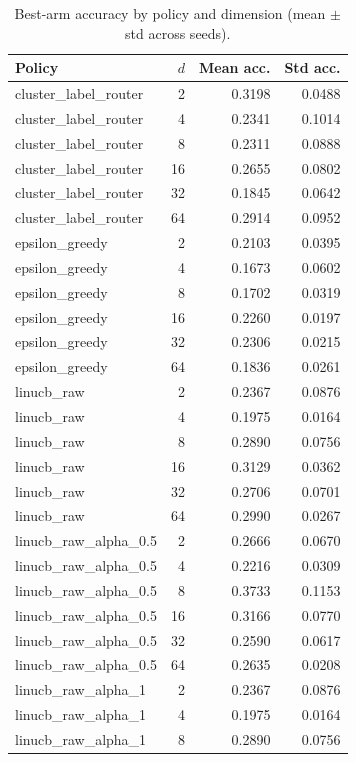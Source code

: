 \begin{table}[t]
\centering
\caption{Best-arm accuracy by policy and dimension (mean $\pm$ std across seeds).}
\label{tab:best-arm-acc-summary}
\begin{tabular}{lrrr}
\toprule
Policy & $d$ & Mean acc. & Std acc. \\
\midrule
cluster\_label\_router & 2 & 0.3198 & 0.0488 \\
cluster\_label\_router & 4 & 0.2341 & 0.1014 \\
cluster\_label\_router & 8 & 0.2311 & 0.0888 \\
cluster\_label\_router & 16 & 0.2655 & 0.0802 \\
cluster\_label\_router & 32 & 0.1845 & 0.0642 \\
cluster\_label\_router & 64 & 0.2914 & 0.0952 \\
epsilon\_greedy & 2 & 0.2103 & 0.0395 \\
epsilon\_greedy & 4 & 0.1673 & 0.0602 \\
epsilon\_greedy & 8 & 0.1702 & 0.0319 \\
epsilon\_greedy & 16 & 0.2260 & 0.0197 \\
epsilon\_greedy & 32 & 0.2306 & 0.0215 \\
epsilon\_greedy & 64 & 0.1836 & 0.0261 \\
linucb\_raw & 2 & 0.2367 & 0.0876 \\
linucb\_raw & 4 & 0.1975 & 0.0164 \\
linucb\_raw & 8 & 0.2890 & 0.0756 \\
linucb\_raw & 16 & 0.3129 & 0.0362 \\
linucb\_raw & 32 & 0.2706 & 0.0701 \\
linucb\_raw & 64 & 0.2990 & 0.0267 \\
linucb\_raw\_alpha\_0.5 & 2 & 0.2666 & 0.0670 \\
linucb\_raw\_alpha\_0.5 & 4 & 0.2216 & 0.0309 \\
linucb\_raw\_alpha\_0.5 & 8 & 0.3733 & 0.1153 \\
linucb\_raw\_alpha\_0.5 & 16 & 0.3166 & 0.0770 \\
linucb\_raw\_alpha\_0.5 & 32 & 0.2590 & 0.0617 \\
linucb\_raw\_alpha\_0.5 & 64 & 0.2635 & 0.0208 \\
linucb\_raw\_alpha\_1 & 2 & 0.2367 & 0.0876 \\
linucb\_raw\_alpha\_1 & 4 & 0.1975 & 0.0164 \\
linucb\_raw\_alpha\_1 & 8 & 0.2890 & 0.0756 \\

\end{tabular}
\end{table}
